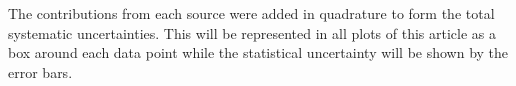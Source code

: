 \documentclass[ALICE,manyauthors]{cernphprep}
\begin{document}
The contributions from each source were added in quadrature to form the total systematic uncertainties. This will be represented in all plots of this article as a box around each data point while the statistical uncertainty will be shown by the error bars.



\end{document}
